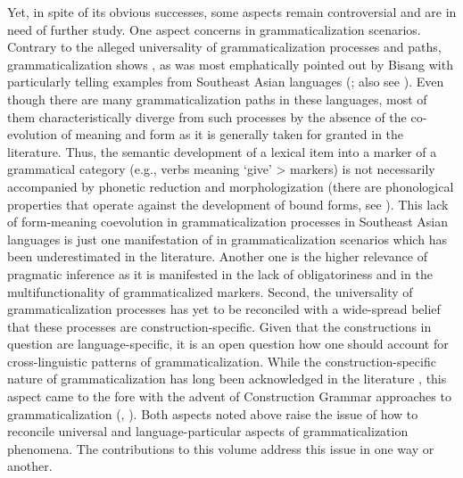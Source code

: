 \documentclass[output=paper]{LSP/langsci}
\begin{document}
Yet, in spite of its obvious successes, some aspects remain controversial and are in need of further study. One aspect concerns  in grammaticalization scenarios. Contrary to the alleged universality of grammaticalization processes and paths, grammaticalization shows , as was most emphatically pointed out by Bisang with particularly telling examples from Southeast Asian languages (\citealt{Bisang1996,Bisang2004tam,Bisang2011,Bisang2015}; also see  \citealt{Ansaldo2004}). Even though there are many grammaticalization paths in these languages, most of them characteristically diverge from such processes by the absence of the co-evolution of meaning and form as it is generally taken for granted in the literature. Thus, the semantic development of a lexical item into a marker of a grammatical category (e.g., verbs meaning ‘give’ >  markers) is not necessarily accompanied by phonetic reduction and morphologization (there are phonological properties that operate against the development of bound forms, see \citealt{Ansaldo2004}). This lack of form-meaning coevolution in grammaticalization processes in Southeast Asian languages is just one manifestation of  in grammaticalization scenarios which has been underestimated in the literature. Another one is the higher relevance of pragmatic inference as it is manifested in the lack of obligatoriness and in the multifunctionality of grammaticalized markers. Second, the universality of grammaticalization processes has yet to be reconciled with a wide-spread belief that these processes are construction-specific. Given that the constructions in question are language-specific, it is an open question how one should account for cross-linguistic patterns of grammaticalization. While the construction-specific nature of grammaticalization has long been acknowledged in the literature \citep{BybeeEtAl1994}, this aspect came to the fore with the advent of Construction Grammar approaches to grammaticalization (\citealt{GisbornePatten2011}, \citealt{Traugott2013}). Both aspects noted above raise the issue of how to reconcile universal and language-particular aspects of grammaticalization phenomena. The contributions to this volume address this issue in one way or another.
\end{document}
